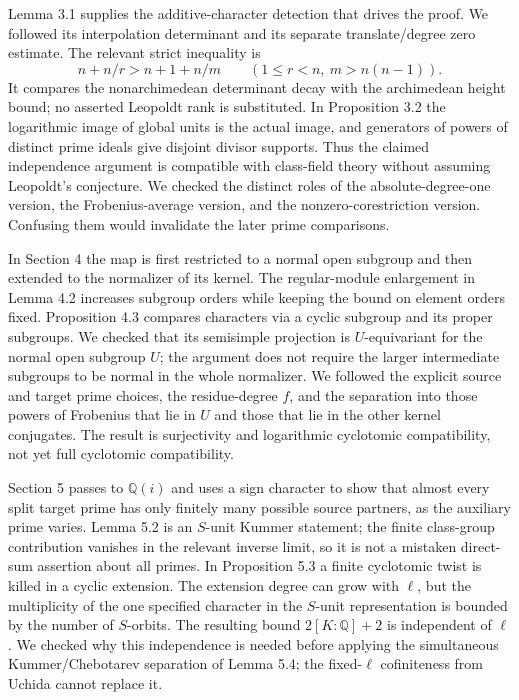 Lemma 3.1 supplies the additive-character detection that drives the proof.
We followed its interpolation determinant and its separate translate/degree
zero estimate.  The relevant strict inequality is
\[
 n+n/r>n+1+n/m\qquad(1\leq r<n,\ m>n(n-1)).
\]
It compares the nonarchimedean determinant decay with the archimedean height
bound; no asserted Leopoldt rank is substituted.  In Proposition 3.2 the
logarithmic image of global units is the actual image, and generators of
powers of distinct prime ideals give disjoint divisor supports.  Thus the
claimed independence argument is compatible with class-field theory without
assuming Leopoldt's conjecture.  We checked the distinct roles of the
absolute-degree-one version, the Frobenius-average version, and the
nonzero-corestriction version.  Confusing them would invalidate the later
prime comparisons.

In Section 4 the map is first restricted to a normal open subgroup and then
extended to the normalizer of its kernel.  The regular-module enlargement
in Lemma 4.2 increases subgroup orders while keeping the bound on element
orders fixed.  Proposition 4.3 compares characters via a cyclic subgroup
and its proper subgroups.  We checked that its semisimple projection is
$U$-equivariant for the normal open subgroup $U$; the argument does not
require the larger intermediate subgroups to be normal in the whole
normalizer.  We followed the explicit source and target prime choices,
the residue-degree $f$, and the separation into those powers of Frobenius
that lie in $U$ and those that lie in the other kernel conjugates.
The result is surjectivity and logarithmic cyclotomic compatibility, not yet
full cyclotomic compatibility.

Section 5 passes to $\mathbb Q(i)$ and uses a sign character to show that
almost every split target prime has only finitely many possible source
partners, as the auxiliary prime varies.  Lemma 5.2 is an $S$-unit Kummer
statement; the finite class-group contribution vanishes in the relevant
inverse limit, so it is not a mistaken direct-sum assertion about all primes.
In Proposition 5.3 a finite cyclotomic twist is killed in a cyclic extension.
The extension degree can grow with $\ell$, but the multiplicity of the one
specified character in the $S$-unit representation is bounded by the number
of $S$-orbits.  The resulting bound $2[K:\mathbb Q]+2$ is independent of
$\ell$.  We checked why this independence is needed before applying the
simultaneous Kummer/Chebotarev separation of Lemma 5.4; the fixed-$\ell$
cofiniteness from Uchida cannot replace it.

